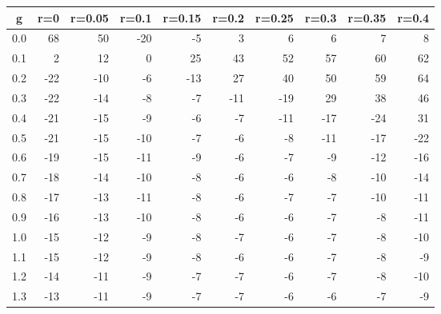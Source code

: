 %
\begin{table}[!tbp]
 \begin{center}
 \begin{tabular}{rrrrrrrrrr}\hline\hline
\multicolumn{1}{c}{g}&\multicolumn{1}{c}{r=0}&\multicolumn{1}{c}{r=0.05}&\multicolumn{1}{c}{r=0.1}&\multicolumn{1}{c}{r=0.15}&\multicolumn{1}{c}{r=0.2}&\multicolumn{1}{c}{r=0.25}&\multicolumn{1}{c}{r=0.3}&\multicolumn{1}{c}{r=0.35}&\multicolumn{1}{c}{r=0.4}\tabularnewline
\hline
0.0& 68& 50&-20& -5&  3&  6&  6&  7&  8\tabularnewline
0.1&  2& 12&  0& 25& 43& 52& 57& 60& 62\tabularnewline
0.2&-22&-10& -6&-13& 27& 40& 50& 59& 64\tabularnewline
0.3&-22&-14& -8& -7&-11&-19& 29& 38& 46\tabularnewline
0.4&-21&-15& -9& -6& -7&-11&-17&-24& 31\tabularnewline
0.5&-21&-15&-10& -7& -6& -8&-11&-17&-22\tabularnewline
0.6&-19&-15&-11& -9& -6& -7& -9&-12&-16\tabularnewline
0.7&-18&-14&-10& -8& -6& -6& -8&-10&-14\tabularnewline
0.8&-17&-13&-11& -8& -6& -7& -7&-10&-11\tabularnewline
0.9&-16&-13&-10& -8& -6& -6& -7& -8&-11\tabularnewline
1.0&-15&-12& -9& -8& -7& -6& -7& -8&-10\tabularnewline
1.1&-15&-12& -9& -8& -6& -6& -7& -8& -9\tabularnewline
1.2&-14&-11& -9& -7& -7& -6& -7& -8&-10\tabularnewline
1.3&-13&-11& -9& -7& -7& -6& -6& -7& -9\tabularnewline
\hline
\end{tabular}

\end{center}

\end{table}

